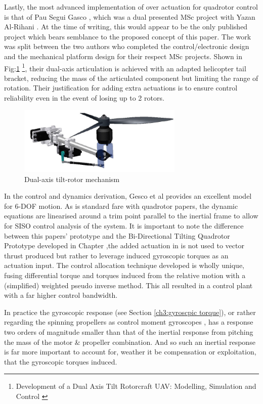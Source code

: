 \par
Lastly, the most advanced implementation of over actuation for quadrotor control is that of Pau Segui Gasco \cite{tiltgasco}, which was a dual presented MSc project with Yazan Al-Rihani \cite{tiltrihani}. At the time of writing, this would appear to be the only published project which bears semblance to the proposed concept of this paper. The work was split between the two authors who completed the control/electronic design and the mechanical platform design for their respect MSc projects. Shown in Fig:\ref{fig:tiltrotor-gasco} \footnote{Development of a Dual Axis Tilt Rotorcraft UAV: Modelling, Simulation and Control \cite{tiltgasco}}, their dual-axis articulation is achieved with an adapted helicopter tail bracket, reducing the mass of the articulated component but limiting the range of rotation. Their justification for adding extra actuations is to ensure control reliability even in the event of losing up to 2 rotors.
\begin{figure}[hbtp]
\centering
\includegraphics[width=0.7\textwidth]{figs/gasco-mech}
\caption{Dual-axis tilt-rotor mechanism}
\label{fig:tiltrotor-gasco}
\end{figure}
\par
In the control and dynamics derivation, Gesco et al provides an excellent model for 6-DOF motion. As is standard fare with quadrotor papers, the dynamic equations are linearised around a trim point parallel to the inertial frame to allow for SISO control analysis of the system. It is important to note the difference between this papers' prototype and the Bi-Directional Tilting Quadrotor Prototype developed in Chapter \cite{ch:design} ,the added actuation in \cite{tiltgasco} is not used to vector thrust produced but rather to leverage induced gyroscopic torques as an actuation input. The control allocation technique developed is wholly unique, fusing differential torque and torques induced from the relative motion with a (simplified) weighted pseudo inverse method. This all resulted in a control plant with a far higher control bandwidth. 
\par
In practice the gyroscopic response (see Section \ref{ch3:gyroscpic torque}), or rather regarding the spinning propellers as control moment gyroscopes \cite{cmg}, has a response two orders of magnitude smaller than that of the inertial response from pitching the mass of the motor \& propeller combination. And so such an inertial response is far more important to account for, weather it be compensation or exploitation, that the gyroscopic torques induced.
